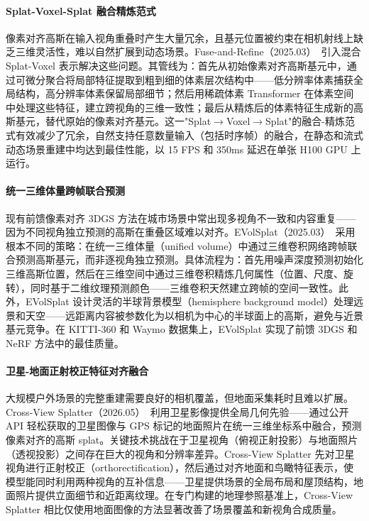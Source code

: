\paragraph{Splat-Voxel-Splat 融合精炼范式}

像素对齐高斯在输入视角重叠时产生大量冗余，且基元位置被约束在相机射线上缺乏三维灵活性，难以自然扩展到动态场景。Fuse-and-Refine（2025.03）~\cite{2503_14698}引入混合 Splat-Voxel 表示解决这些问题。其管线为：首先从初始像素对齐高斯基元中，通过可微分聚合将局部特征提取到粗到细的体素层次结构中——低分辨率体素捕获全局结构，高分辨率体素保留局部细节；然后用稀疏体素 Transformer 在体素空间中处理这些特征，建立跨视角的三维一致性；最后从精炼后的体素特征生成新的高斯基元，替代原始的像素对齐基元。这一"Splat$\to$Voxel$\to$Splat"的融合-精炼范式有效减少了冗余，自然支持任意数量输入（包括时序帧）的融合，在静态和流式动态场景重建中均达到最佳性能，以 15 FPS 和 350ms 延迟在单张 H100 GPU 上运行。

\paragraph{统一三维体量跨帧联合预测}

现有前馈像素对齐 3DGS 方法在城市场景中常出现多视角不一致和内容重复——因为不同视角独立预测的高斯在重叠区域难以对齐。EVolSplat（2025.03）~\cite{2503_20168}采用根本不同的策略：在统一三维体量（unified volume）中通过三维卷积网络跨帧联合预测高斯基元，而非逐视角独立预测。具体流程为：首先用噪声深度预测初始化三维高斯位置，然后在三维空间中通过三维卷积精炼几何属性（位置、尺度、旋转），同时基于二维纹理预测颜色——三维卷积天然建立跨帧的空间一致性。此外，EVolSplat 设计灵活的半球背景模型（hemisphere background model）处理远景和天空——远距离内容被参数化为以相机为中心的半球面上的高斯，避免与近景基元竞争。在 KITTI-360 和 Waymo 数据集上，EVolSplat 实现了前馈 3DGS 和 NeRF 方法中的最佳质量。

\paragraph{卫星-地面正射校正特征对齐融合}

大规模户外场景的完整重建需要良好的相机覆盖，但地面采集耗时且难以扩展。Cross-View Splatter（2026.05）~\cite{2605_19656}利用卫星影像提供全局几何先验——通过公开 API 轻松获取的卫星图像与 GPS 标记的地面照片在统一三维坐标系中融合，预测像素对齐的高斯 splat。关键技术挑战在于卫星视角（俯视正射投影）与地面照片（透视投影）之间存在巨大的视角和分辨率差异。Cross-View Splatter 先对卫星视角进行正射校正（orthorectification），然后通过对齐地面和鸟瞰特征表示，使模型能同时利用两种视角的互补信息——卫星提供场景的全局布局和屋顶结构，地面照片提供立面细节和近距离纹理。在专门构建的地理参照基准上，Cross-View Splatter 相比仅使用地面图像的方法显著改善了场景覆盖和新视角合成质量。

